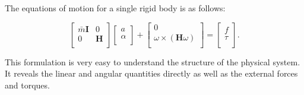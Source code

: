 \documentclass[a4paper,10pt]{article}
\begin{document}
The equations of motion for a single rigid body is as follows:

\begin{equation}
\left[ {\begin{array}{cc}
 \bar{m}\mathbf{I}  &  0 \\
 0            & \mathbf{H}  \\
 \end{array} } \right]
 \left[ {\begin{array}{c}
 a  \\
 \alpha              \\
 \end{array} } \right]
 +
 \left[ {\begin{array}{c}
 0  \\
 \omega\times(\mathbf{H}\omega)   \\
 \end{array} } \right]
 =
 \left[ {\begin{array}{c}
 f  \\
 \tau   \\
 \end{array} } \right].
\end{equation}

This formulation is very easy to understand the structure of
the physical system. It reveals the linear and angular quantities
directly as well as the external forces and torques.
\end{document}
